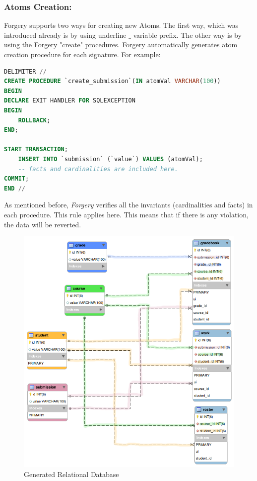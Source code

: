 \documentclass[oneside]{book}
\begin{document}
\subsubsection{Atoms Creation:}

\noindent Forgery supports two ways for creating new Atoms. The first way, which was introduced already is by using underline $\_$ variable prefix. The other way is by using the Forgery "create" procedures. Forgery automatically generates atom creation procedure for each signature. For example:
\begin{lstlisting}[escapechar=@,language=SQL]
DELIMITER //
CREATE PROCEDURE `create_submission`(IN atomVal VARCHAR(100))
BEGIN
DECLARE EXIT HANDLER FOR SQLEXCEPTION
BEGIN
	ROLLBACK;
END;

START TRANSACTION;
	INSERT INTO `submission` (`value`) VALUES (atomVal);
	-- facts and cardinalities are included here.
COMMIT;
END //
\end{lstlisting}

\noindent As mentioned before, \textit{Forgery} verifies all the invariants (cardinalities and facts) in each procedure. This rule applies here. This means that if there is any violation, the data will be reverted.

\newpage

\begin{figure}[h!]
\centering
\includegraphics[scale=0.5]{3}
\caption{Generated Relational Database}
\end{figure}
\end{document}
